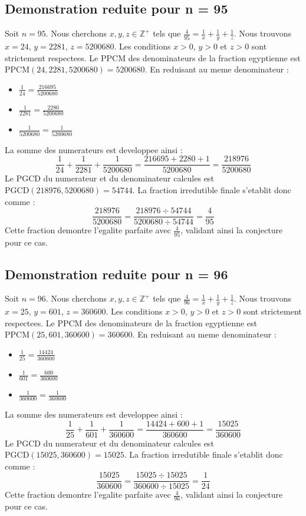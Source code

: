 \documentclass[11pt,a4paper]{article}
\begin{document}
\subsection{Demonstration reduite pour n = 95}
Soit $n = 95$. Nous cherchons $x, y, z \in \mathbb{Z}^{+}$ tels que $\frac{4}{95} = \frac{1}{x} + \frac{1}{y} + \frac{1}{z}$.
Nous trouvons $x = 24$, $y = 2281$, $z = 5200680$.
Les conditions $x > 0$, $y > 0$ et $z > 0$ sont strictement respectees.
Le PPCM des denominateurs de la fraction egyptienne est $\text{PPCM}(24, 2281, 5200680) = 5200680$.
En reduisant au meme denominateur :
\begin{itemize}
    \item $\frac{1}{24} = \frac{216695}{5200680}$
    \item $\frac{1}{2281} = \frac{2280}{5200680}$
    \item $\frac{1}{5200680} = \frac{1}{5200680}$
\end{itemize}
La somme des numerateurs est developpee ainsi :
$$ \frac{1}{24} + \frac{1}{2281} + \frac{1}{5200680} = \frac{216695 + 2280 + 1}{5200680} = \frac{218976}{5200680} $$
Le PGCD du numerateur et du denominateur calcules est $\text{PGCD}(218976, 5200680) = 54744$.
La fraction irredutible finale s'etablit donc comme :
$$ \frac{218976}{5200680} = \frac{218976 \div 54744}{5200680 \div 54744} = \frac{4}{95} $$
Cette fraction demontre l'egalite parfaite avec $\frac{4}{95}$, validant ainsi la conjecture pour ce cas.

\subsection{Demonstration reduite pour n = 96}
Soit $n = 96$. Nous cherchons $x, y, z \in \mathbb{Z}^{+}$ tels que $\frac{4}{96} = \frac{1}{x} + \frac{1}{y} + \frac{1}{z}$.
Nous trouvons $x = 25$, $y = 601$, $z = 360600$.
Les conditions $x > 0$, $y > 0$ et $z > 0$ sont strictement respectees.
Le PPCM des denominateurs de la fraction egyptienne est $\text{PPCM}(25, 601, 360600) = 360600$.
En reduisant au meme denominateur :
\begin{itemize}
    \item $\frac{1}{25} = \frac{14424}{360600}$
    \item $\frac{1}{601} = \frac{600}{360600}$
    \item $\frac{1}{360600} = \frac{1}{360600}$
\end{itemize}
La somme des numerateurs est developpee ainsi :
$$ \frac{1}{25} + \frac{1}{601} + \frac{1}{360600} = \frac{14424 + 600 + 1}{360600} = \frac{15025}{360600} $$
Le PGCD du numerateur et du denominateur calcules est $\text{PGCD}(15025, 360600) = 15025$.
La fraction irredutible finale s'etablit donc comme :
$$ \frac{15025}{360600} = \frac{15025 \div 15025}{360600 \div 15025} = \frac{1}{24} $$
Cette fraction demontre l'egalite parfaite avec $\frac{4}{96}$, validant ainsi la conjecture pour ce cas.
\end{document}
